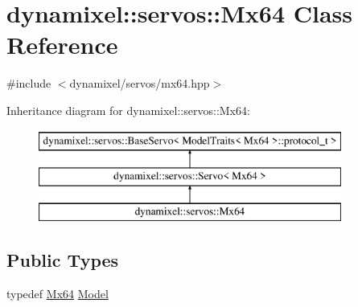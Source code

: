 \hypertarget{classdynamixel_1_1servos_1_1_mx64}{}\section{dynamixel\+:\+:servos\+:\+:Mx64 Class Reference}
\label{classdynamixel_1_1servos_1_1_mx64}


{\ttfamily \#include $<$dynamixel/servos/mx64.\+hpp$>$}

Inheritance diagram for dynamixel\+:\+:servos\+:\+:Mx64\+:\begin{figure}[H]
\begin{center}
\leavevmode
\includegraphics[height=3.000000cm]{classdynamixel_1_1servos_1_1_mx64}
\end{center}
\end{figure}
\subsection*{Public Types}
\begin{DoxyCompactItemize}
\item 
typedef \hyperlink{classdynamixel_1_1servos_1_1_mx64}{Mx64} \hyperlink{classdynamixel_1_1servos_1_1_mx64_ae5a27a1b2e179fcfb77035708795f849}{Model}
\end{DoxyCompactItemize}
